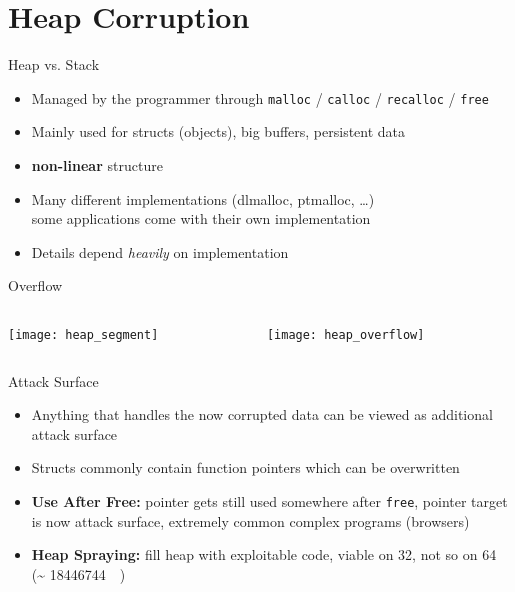 \documentclass[beamer]{uibk}
\begin{document}
\section{Heap Corruption}

\begin{frame}{Heap vs. Stack}
    \begin{itemize}
        \item Managed by the programmer through \texttt{malloc} /
            \texttt{calloc} / \texttt{recalloc} / \texttt{free}
        \medskip
        \item Mainly used for structs (objects), big buffers, persistent data
        \medskip
        \item \textbf{non-linear} structure
        \medskip
        \item Many different implementations (dlmalloc, ptmalloc, \dots)\\
            some applications come with their own implementation
        \medskip
        \item Details depend \emph{heavily} on implementation
    \end{itemize}
\end{frame}

\begin{frame}{Overflow}
    \begin{columns}
        \begin{column}{0.5\textwidth}
            \begin{center}
                \texttt{[image: heap\_segment]}
            \end{center}
        \end{column}
        \begin{column}{0.5\textwidth}
            \begin{center}
                \texttt{[image: heap\_overflow]}
            \end{center}
        \end{column}
    \end{columns}
\end{frame}

\begin{frame}{Attack Surface}
    \begin{itemize}
        \item Anything that handles the now corrupted data can be viewed as
            additional attack surface
        \medskip
        \pause
        \item Structs commonly contain function pointers which can be
            overwritten
        \bigskip
        \pause
        \item \textbf{Use After Free:} pointer gets still used somewhere after
            \texttt{free}, pointer target is now attack surface, extremely
            common complex programs (browsers)
        \medskip
        \item \textbf{Heap Spraying:} fill heap with exploitable code, viable
            on \SI{32}{\bit}, not so on \SI{64}{\bit} (\textasciitilde
            \SI{18446744}{\tera\byte})
    \end{itemize}
\end{frame}
\end{document}
